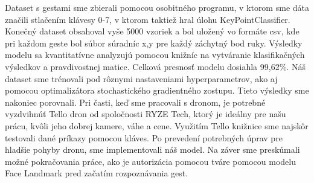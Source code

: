 Dataset s gestami sme zbierali pomocou osobitného programu, v ktorom sme dáta značili stlačením klávesy 0-7, v ktorom taktiež hral úlohu KeyPointClassifier. Konečný dataset obsahoval vyše 5000 vzoriek a bol uložený vo formáte csv, kde pri každom geste bol súbor súradníc x,y pre každý záchytný bod ruky. Výsledky modelu sa kvantitatívne analyzujú pomocou knižníc na vytváranie klasifikačných výsledkov a pravdivostnej matice. Celková presnosť modelu dosiahla 99,62\%. Náš dataset sme trénovali pod rôznymi nastaveniami hyperparametrov, ako aj pomocou optimalizátora stochastického gradientného zostupu. Tieto výsledky sme nakoniec porovnali. \newline
Pri časti, keď sme pracovali s dronom, je potrebné vyzdvihnúť Tello dron od spoločnosti RYZE Tech, ktorý je ideálny pre našu prácu, kvôli jeho dobrej kamere, váhe a cene. Využitím Tello knižnice sme najskôr testovali dané príkazy pomocou kláves. Po prevedení potrebných úprav pre hladšie pohyby dronu, sme implementovali náš model.\newline
Na záver sme preskúmali možné pokračovania práce, ako je autorizácia pomocou tváre pomocou modelu Face Landmark pred začatím rozpoznávania gest.




